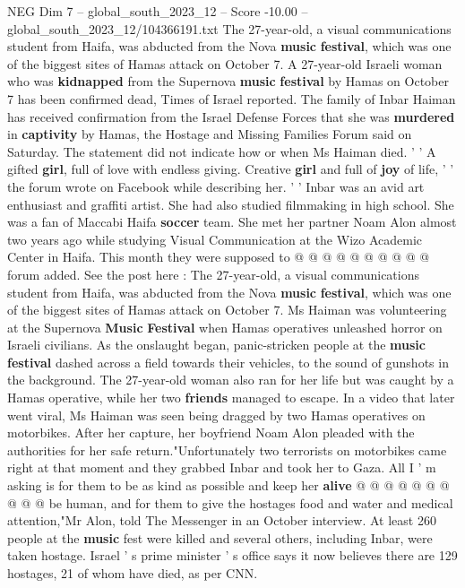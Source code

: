 \begin{textsample}{NEG Dim 7 – global\_south\_2023\_12 – Score -10.00 – global\_south\_2023\_12/104366191.txt}  \label{ex:f7_neg_411}
The 27-year-old, a visual communications student from Haifa, was abducted from the Nova \textbf{music} \textbf{festival}, which was one of the biggest sites of Hamas attack on October 7.
A 27-year-old Israeli woman who was \textbf{kidnapped} from the Supernova \textbf{music} \textbf{festival} by Hamas on October 7 has been confirmed dead, Times of Israel reported.
The family of Inbar Haiman has received confirmation from the Israel Defense Forces that she was \textbf{murdered} in \textbf{captivity} by Hamas, the Hostage and Missing Families Forum said on Saturday.
The statement did not indicate how or when Ms Haiman died. ' ' A gifted \textbf{girl}, full of love with endless giving.
Creative \textbf{girl} and full of \textbf{joy} of life, ' ' the forum wrote on Facebook while describing her. ' ' Inbar was an avid art enthusiast and graffiti artist.
She had also studied filmmaking in high school.
She was a fan of Maccabi Haifa \textbf{soccer} team.
She met her partner Noam Alon almost two years ago while studying Visual Communication at the Wizo Academic Center in Haifa.
This month they were supposed to @ @ @ @ @ @ @ @ @ @ forum added.
See the post here : The 27-year-old, a visual communications student from Haifa, was abducted from the Nova \textbf{music} \textbf{festival}, which was one of the biggest sites of Hamas attack on October 7.
Ms Haiman was volunteering at the Supernova \textbf{Music} \textbf{Festival} when Hamas operatives unleashed horror on Israeli civilians.
As the onslaught began, panic-stricken people at the \textbf{music} \textbf{festival} dashed across a field towards their vehicles, to the sound of gunshots in the background.
The 27-year-old woman also ran for her life but was caught by a Hamas operative, while her two \textbf{friends} managed to escape.
In a video that later went viral, Ms Haiman was seen being dragged by two Hamas operatives on motorbikes.
After her capture, her boyfriend Noam Alon pleaded with the authorities for her safe return."Unfortunately two terrorists on motorbikes came right at that moment and they grabbed Inbar and took her to Gaza.
All I ' m asking is for them to be as kind as possible and keep her \textbf{alive} @ @ @ @ @ @ @ @ @ @ be human, and for them to give the hostages food and water and medical attention,"Mr Alon, told The Messenger in an October interview.
At least 260 people at the \textbf{music} fest were killed and several others, including Inbar, were taken hostage.
Israel ' s prime minister ' s office says it now believes there are 129 hostages, 21 of whom have died, as per CNN.

\end{textsample}
